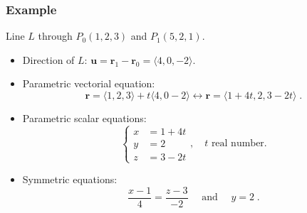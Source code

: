 \begin{frame}
\end{frame}


\begin{frame}
 \frametitle{Example}

Line $L$ through $P_0(1,2,3)$ and $P_1(5,2,1)$.

\begin{itemize}
 \item<2-> Direction of $L$: $\textbf{u} = \textbf{r}_1-\textbf{r}_0 = \langle 4, 0, -2\rangle$.
\item<3-> Parametric vectorial equation:
%
$$\textbf{r} = \langle 1,2,3\rangle + t \langle 4, 0 -2\rangle \leftrightarrow \textbf{r} = \langle 1+4t, 2, 3-2t\rangle\; .$$
%
\item<4-> Parametric scalar equations:
$$\left\{ \begin{array}{ll}
           x & = 1+4t \\
	   y & = 2 \\
           z & = 3-2t
          \end{array}
\right. , \quad t \text{ real number.}$$
%
\item<5-> Symmetric equations:
%
$$\frac{x-1}{4} = \frac{z-3}{-2} \quad \text{ and } \quad y=2\; .$$
\end{itemize}

\end{frame}